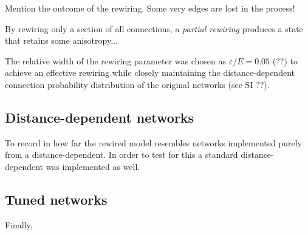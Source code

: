 Mention the outcome of the rewiring. Some very edges are lost in the process! %

By rewiring only a section of all connections, a \textit{partial
  rewiring} produces a state that retains some anisotropy...



The relative width of the rewiring parameter was chosen as $\varepsilon / E = 0.05$ (??) to achieve an effective rewiring while closely maintaining the distance-dependent connection probability distribution of the original networks (see SI ??).



\subsection*{Distance-dependent networks}

To record in how far the rewired model resembles networks implemented
purely from a distance-dependent. In order to test for this a standard
distance-dependent was implemented as well.




\subsection*{Tuned networks}

Finally, 



